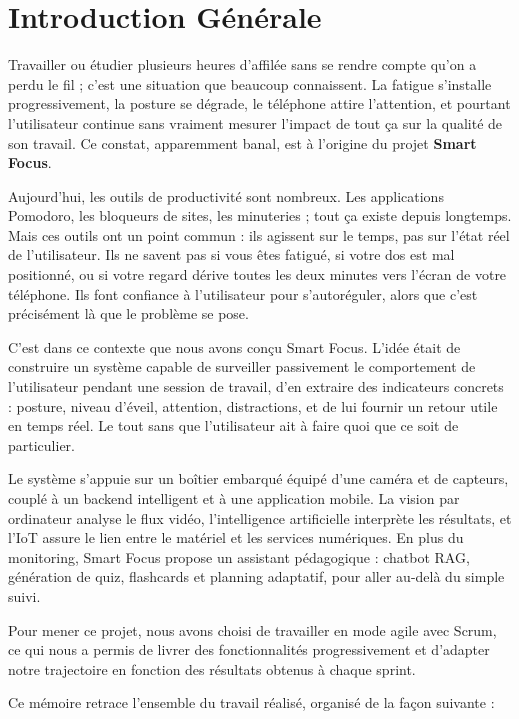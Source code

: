 \chapter*{Introduction Générale}

Travailler ou étudier plusieurs heures d’affilée sans se rendre compte qu’on a perdu le fil ; c’est une situation que beaucoup connaissent. La fatigue s’installe progressivement, la posture se dégrade, le téléphone attire l’attention, et pourtant l’utilisateur continue sans vraiment mesurer l’impact de tout ça sur la qualité de son travail. Ce constat, apparemment banal, est à l’origine du projet \textbf{Smart Focus}.

Aujourd’hui, les outils de productivité sont nombreux. Les applications Pomodoro, les bloqueurs de sites, les minuteries ; tout ça existe depuis longtemps. Mais ces outils ont un point commun : ils agissent sur le temps, pas sur l’état réel de l’utilisateur. Ils ne savent pas si vous êtes fatigué, si votre dos est mal positionné, ou si votre regard dérive toutes les deux minutes vers l’écran de votre téléphone. Ils font confiance à l’utilisateur pour s’autoréguler, alors que c’est précisément là que le problème se pose.

C’est dans ce contexte que nous avons conçu Smart Focus. L’idée était de construire un système capable de surveiller passivement le comportement de l’utilisateur pendant une session de travail, d’en extraire des indicateurs concrets : posture, niveau d’éveil, attention, distractions, et de lui fournir un retour utile en temps réel. Le tout sans que l’utilisateur ait à faire quoi que ce soit de particulier.

Le système s’appuie sur un boîtier embarqué équipé d’une caméra et de capteurs, couplé à un backend intelligent et à une application mobile. La vision par ordinateur analyse le flux vidéo, l’intelligence artificielle interprète les résultats, et l’IoT assure le lien entre le matériel et les services numériques. En plus du monitoring, Smart Focus propose un assistant pédagogique : chatbot RAG, génération de quiz, flashcards et planning adaptatif, pour aller au-delà du simple suivi.

Pour mener ce projet, nous avons choisi de travailler en mode agile avec Scrum, ce qui nous a permis de livrer des fonctionnalités progressivement et d’adapter notre trajectoire en fonction des résultats obtenus à chaque sprint.

Ce mémoire retrace l’ensemble du travail réalisé, organisé de la façon suivante :

